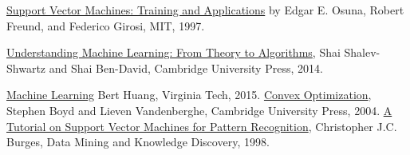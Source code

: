 \documentclass[journal]{IEEEtran}
\begin{document}
\begin{thebibliography}{99}
    \href{https://dspace.mit.edu/bitstream/handle/1721.1/9925/40121760-MIT.pdf?sequence=}{Support Vector Machines: Training and Applications} by Edgar E. Osuna, Robert Freund, and Federico Girosi, MIT, 1997.

 \href{https://www.cs.huji.ac.il/~shais/UnderstandingMachineLearning/understanding-machine-learning-theory-algorithms.pdf}{Understanding Machine Learning: From Theory to Algorithms}, Shai Shalev-Shwartz and Shai Ben-David, Cambridge University Press, 2014.

 \href{https://courses.cs.vt.edu/cs5824/Fall15/pdfs/}{Machine Learning} Bert Huang, Virginia Tech, 2015.
    \href{https://web.stanford.edu/~boyd/cvxbook/bv_cvxbook.pdf}{Convex Optimization}, Stephen Boyd and Lieven Vandenberghe, Cambridge University Press, 2004.    
    \href{https://www.di.ens.fr/~mallat/papiers/svmtutorial.pdf}{A Tutorial on Support Vector Machines for Pattern Recognition}, Christopher J.C. Burges, Data Mining and Knowledge Discovery, 1998.

\end{thebibliography}
\end{document}
